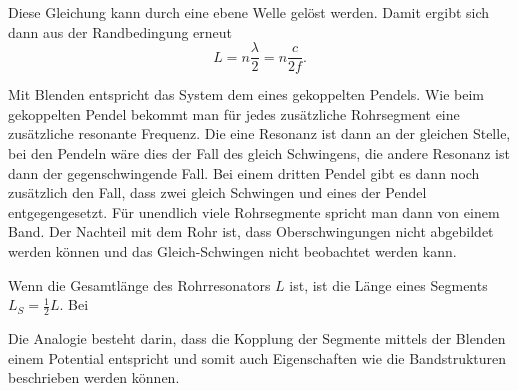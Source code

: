 Diese Gleichung kann durch eine ebene Welle gelöst werden. Damit ergibt sich dann aus der Randbedingung erneut
\begin{equation*}
    L = n \frac{\lambda}{2} = n \frac{c}{2f}.
\end{equation*}

Mit Blenden entspricht das System dem eines gekoppelten Pendels.
Wie beim gekoppelten Pendel bekommt man für jedes zusätzliche Rohrsegment eine zusätzliche resonante Frequenz. 
Die eine Resonanz ist dann an der gleichen Stelle, bei den Pendeln wäre dies der Fall des gleich Schwingens, die andere Resonanz ist dann der gegenschwingende Fall. 
Bei einem dritten Pendel gibt es dann noch zusätzlich den Fall, dass zwei gleich Schwingen und eines der Pendel entgegengesetzt.
Für unendlich viele Rohrsegmente spricht man dann von einem Band. Der Nachteil mit dem Rohr ist, dass Oberschwingungen nicht abgebildet werden können und das Gleich-Schwingen nicht beobachtet werden kann. 

Wenn die Gesamtlänge des Rohrresonators $L$ ist, ist die Länge eines Segments $L_S = \frac{1}{2} L$. 
Bei 

Die Analogie besteht darin, dass die Kopplung der Segmente mittels der Blenden einem Potential entspricht und somit auch Eigenschaften wie die Bandstrukturen beschrieben werden können. 




